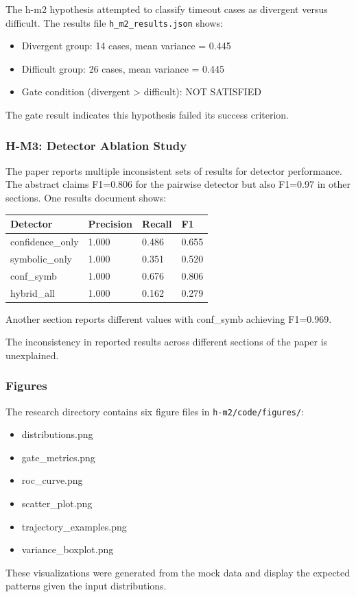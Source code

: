 The h-m2 hypothesis attempted to classify timeout cases as divergent versus difficult. The results file \texttt{h_m2_results.json} shows:

\begin{itemize}
\item Divergent group: 14 cases, mean variance = 0.445
\item Difficult group: 26 cases, mean variance = 0.445
\item Gate condition (divergent > difficult): NOT SATISFIED
\end{itemize}

The gate result indicates this hypothesis failed its success criterion.

\subsubsection{H-M3: Detector Ablation Study}

The paper reports multiple inconsistent sets of results for detector performance. The abstract claims F1=0.806 for the pairwise detector but also F1=0.97 in other sections. One results document shows:

\begin{table}[htbp]
\centering
\begin{tabular}{llll}
\toprule
Detector & Precision & Recall & F1 \\
\midrule
confidence_only & 1.000 & 0.486 & 0.655 \\
symbolic_only & 1.000 & 0.351 & 0.520 \\
conf_symb & 1.000 & 0.676 & 0.806 \\
hybrid_all & 1.000 & 0.162 & 0.279 \\
\bottomrule
\end{tabular}
\end{table}

Another section reports different values with conf_symb achieving F1=0.969.

The inconsistency in reported results across different sections of the paper is unexplained.

\subsubsection{Figures}

The research directory contains six figure files in \texttt{h-m2/code/figures/}:
\begin{itemize}
\item distributions.png
\item gate_metrics.png
\item roc_curve.png
\item scatter_plot.png
\item trajectory_examples.png
\item variance_boxplot.png
\end{itemize}

These visualizations were generated from the mock data and display the expected patterns given the input distributions.
